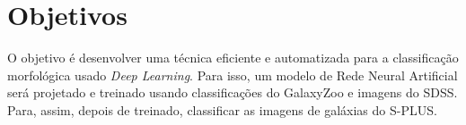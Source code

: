 \section*{Objetivos}

O objetivo é desenvolver uma técnica eficiente e automatizada para a  classificação morfológica usado \emph{Deep Learning}. Para isso, um modelo de Rede Neural Artificial será projetado e treinado usando classificações do GalaxyZoo e imagens do SDSS. Para, assim, depois de treinado, classificar as imagens de galáxias do S-PLUS.